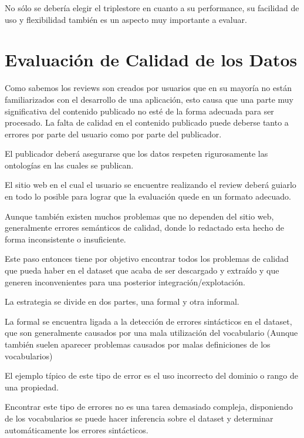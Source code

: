 No sólo se debería elegir el triplestore en cuanto a su performance, su facilidad de uso y flexibilidad también es un aspecto muy importante a evaluar.

%

 

\section{Evaluación de Calidad de los Datos} 
Como sabemos los reviews son creados por usuarios que en su mayoría no están familiarizados con el desarrollo de una 
aplicación, esto causa que una parte muy significativa del contenido publicado no esté de la forma adecuada para ser procesado. 
La falta de calidad en el contenido publicado puede deberse tanto a errores por parte del usuario como por parte del publicador.


El publicador deberá asegurarse que los datos respeten rigurosamente las ontologías en las cuales se publican.

El sitio web en el cual el usuario se encuentre realizando el review deberá guiarlo en todo lo posible para lograr que la evaluación
quede en un formato adecuado.


Aunque también existen muchos problemas que no dependen del sitio web, generalmente errores semánticos de calidad, donde lo 
redactado esta hecho de forma inconsistente o insuficiente.


Este paso entonces tiene por objetivo encontrar todos los problemas de calidad que pueda haber en el dataset que acaba de 
ser descargado y extraído y que generen inconvenientes para una posterior integración/explotación.

La estrategia se divide en dos partes, una formal y otra informal.

La formal se encuentra ligada a la detección de errores sintácticos en el dataset, que son generalmente causados por una mala utilización del vocabulario (Aunque también suelen aparecer problemas causados por malas definiciones de los vocabularios)

El ejemplo típico de este tipo de error es el uso incorrecto del dominio o rango de una propiedad. 

Encontrar este tipo de errores no es una tarea demasiado compleja, disponiendo de los vocabularios se puede hacer inferencia sobre el dataset y determinar automáticamente los errores sintácticos.


